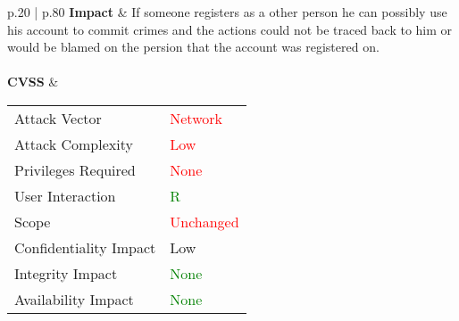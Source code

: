 \begin{longtable*}{p{.20\textwidth} | p{.80\textwidth}}
    \textbf{Impact} &
       If someone registers as a other person he can possibly use his account to commit crimes and the actions could not be traced back to him or would be blamed on the persion that the account was registered on.
    \\\\
    \textbf{CVSS} &
         \begin{tabular}{l | l}
            Attack Vector           & \textcolor{red}{Network} \\
            Attack Complexity       & \textcolor{red}{Low} \\
            Privileges Required     & \textcolor{red}{None} \\
            User Interaction        & \textcolor{Green}{R} \\
            Scope                   & \textcolor{red}{Unchanged} \\
            Confidentiality Impact  & \textcolor{BurntOrange}{Low} \\
            Integrity Impact        & \textcolor{Green}{None} \\
            Availability Impact     & \textcolor{Green}{None}
        \end{tabular}
    \\
    \hline
\end{longtable*}
\clearpage
